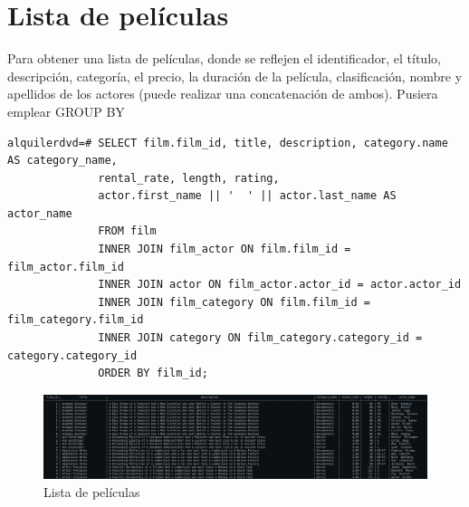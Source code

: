 \documentclass{report}
\begin{document}
\section{Lista de películas}
Para obtener una lista de películas, donde se reflejen el identificador, el
título, descripción, categoría, el precio, la duración de la película,
clasificación, nombre y apellidos de los actores (puede realizar una
concatenación de ambos). Pusiera emplear GROUP BY
\begin{verbatim}
alquilerdvd=# SELECT film.film_id, title, description, category.name AS category_name, 
              rental_rate, length, rating,
              actor.first_name || '  ' || actor.last_name AS actor_name
              FROM film
              INNER JOIN film_actor ON film.film_id = film_actor.film_id
              INNER JOIN actor ON film_actor.actor_id = actor.actor_id
              INNER JOIN film_category ON film.film_id = film_category.film_id
              INNER JOIN category ON film_category.category_id = category.category_id
              ORDER BY film_id;
\end{verbatim}
\begin{figure}[H]
  \centering
  \includegraphics[scale=0.28]{img/querie_c.png}
  \caption{Lista de películas}
  \label{fig:lista de películas}
\end{figure}

\cleardoublepage

\end{document}
